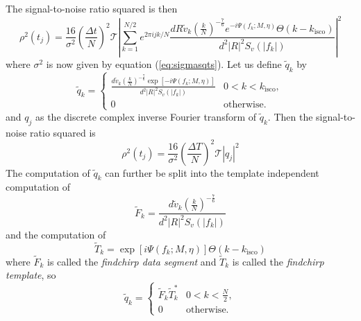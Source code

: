 The signal-to-noise ratio squared is then
\begin{equation}
\rho^2(t_j) = 
\frac{16}{\sigma^2}\left(\frac{\Delta t}{N}\right)^2 \mathcal{T}
\left| 
  \sum_{k=1}^{N/2} e^{2\pi ijk/N} 
  \frac{dR\tilde{v}_k \left(\frac{k}{N}\right)^{-\frac{7}{6}} e^{-i\Psi(f_k;M,\eta)}\Theta(k-k_\mathrm{isco})}
       {d^2|R|^2 S_v\left(\left|f_k\right|\right)}
\right|^2 
\label{eq:signaltonoisesq}
\end{equation}
where $\sigma^2$ is now given by equation (\ref{eq:sigmasqts}).  Let us define
$\tilde{q}_k$ by
\begin{equation}
\label{eq:qtildedef}
\tilde{q}_k = 
\begin{cases}
\frac{d\tilde{v}_k \left(\frac{k}{N}\right)^{-\frac{7}{6}} \exp\left[-i\Psi(f_k;M,\eta)\right]}
     {d^2|R|^2S_v\left(\left|f_k\right|\right)} & 0 < k < k_\mathrm{isco}, \\
0 & \text{otherwise}.
\end{cases}
\end{equation}
and $q_j$ as the discrete complex inverse Fourier transform of $\tilde{q}_k$. Then
the signal-to-noise ratio squared is
\begin{equation}
\rho^2(t_j) = \frac{16}{\sigma^2}\left(\frac{\Delta T}{N}\right)^2 \mathcal{T}
\left|q_j\right|^2
\end{equation}
The computation of $\tilde{q}_k$ can further be split into the template
independent computation of
\begin{equation}
\tilde{F}_k = \frac{d\tilde{v}_k \left(\frac{k}{N}\right)^{-\frac{7}{6}}}
{d^2|R|^2S_v\left(\left|f_k\right|\right)}
\end{equation}
and the computation of
\begin{equation}
\tilde{T}_k = \exp\left[i\Psi(f_k;M,\eta)\right] \Theta\left(k-k_\mathrm{isco}\right)
\end{equation}
where $\tilde{F}_k$ is called the \emph{findchirp data segment} and 
$\tilde{T}_k$ is called the \emph{findchirp template}, so
\begin{equation}
\tilde{q}_k = 
\begin{cases}
\tilde{F}_k \tilde{T}_k^\ast & 0 < k < \frac{N}{2},\\
0 & \text{otherwise}.
\end{cases}
\end{equation}

